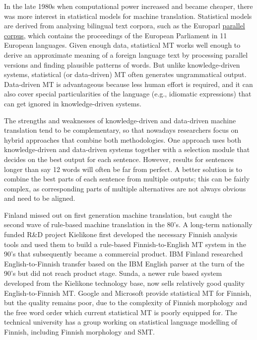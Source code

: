\documentclass{../../metanetpaper}
\begin{document}
\begin{Parallel}[c]{79mm}{78mm}
{In the late 1980s when computational power increased and became cheaper, there
was more interest in statistical models for machine translation. Statistical
models are derived from analysing bilingual text corpora, such as the Europarl
\underline{parallel corpus}, which contains the proceedings of the European Parliament in
11 European languages. Given enough data, statistical MT works well enough to
derive an approximate meaning of a foreign language text by processing parallel
versions and finding plausible patterns of words. But unlike knowledge-driven
systems, statistical (or data-driven) MT often generates ungrammatical output.
Data-driven MT is advantageous because less human effort is required, and it
can also cover special particularities of the language (e.g., idiomatic
expressions) that can get ignored in knowledge-driven systems.




The strengths and weaknesses of knowledge-driven and data-driven machine
translation tend to be complementary, so that nowadays researchers focus on
hybrid approaches that combine both methodologies. One approach uses both
knowledge-driven and data-driven systems together with a selection module that
decides on the best output for each sentence. However, results for sentences
longer than say 12 words will often be far from perfect. A better solution is
to combine the best parts of each sentence from multiple outputs; this can be
fairly complex, as corresponding parts of multiple alternatives are not always
obvious and need to be aligned.

Finland missed out on first generation machine translation, but caught the
second wave of rule-based machine translation in the 80’s. A long-term
nationally funded R\&D project Kielikone first developed the necessary Finnish
analysis tools and used them to build a rule-based Finnish-to-English MT system
in the 90’s that subsequently became a commercial product. IBM Finland
researched English-to-Finnish transfer based on the IBM English parser at the
turn of the 90’s but did not reach product stage. Sunda, a newer rule based
system developed from the Kielikone technology base, now sells relatively good
quality English-to-Finnish MT. Google and Microsoft provide statistical MT for
Finnish, but the quality remains poor, due to the complexity of Finnish
morphology and the free word order which current statistical MT is poorly
equipped for. The technical university has a group working on statistical
language modelling of Finnish, including Finnish morphology and SMT.

}
\end{Parallel}
\end{document}
